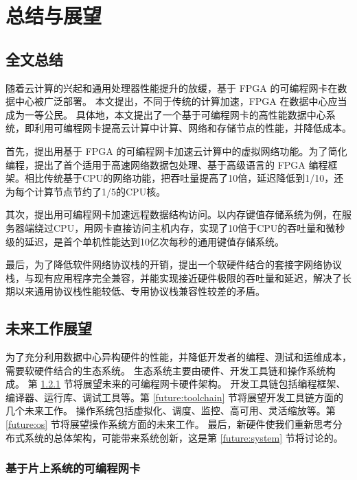 \chapter{总结与展望}

\section{全文总结}

随着云计算的兴起和通用处理器性能提升的放缓，基于 FPGA 的可编程网卡在数据中心被广泛部署。
本文提出，不同于传统的计算加速，FPGA 在数据中心应当成为一等公民。
具体地，本文提出了一个基于可编程网卡的高性能数据中心系统，即利用可编程网卡提高云计算中计算、网络和存储节点的性能，并降低成本。

首先，提出用基于 FPGA 的可编程网卡加速云计算中的虚拟网络功能。为了简化编程，提出了首个适用于高速网络数据包处理、基于高级语言的 FPGA 编程框架。相比传统基于CPU的网络功能，把吞吐量提高了10倍，延迟降低到1/10，还为每个计算节点节约了1/5的CPU核。

其次，提出用可编程网卡加速远程数据结构访问。以内存键值存储系统为例，在服务器端绕过CPU，用网卡直接访问主机内存，实现了10倍于CPU的吞吐量和微秒级的延迟，是首个单机性能达到10亿次每秒的通用键值存储系统。

最后，为了降低软件网络协议栈的开销，提出一个软硬件结合的套接字网络协议栈，与现有应用程序完全兼容，并能实现接近硬件极限的吞吐量和延迟，解决了长期以来通用协议栈性能较低、专用协议栈兼容性较差的矛盾。

\section{未来工作展望}

为了充分利用数据中心异构硬件的性能，并降低开发者的编程、测试和运维成本，需要软硬件结合的生态系统。
生态系统主要由硬件、开发工具链和操作系统构成。
第 \ref{future:progammable_nic} 节将展望未来的可编程网卡硬件架构。
开发工具链包括编程框架、编译器、运行库、调试工具等。第 \ref{future:toolchain} 节将展望开发工具链方面的几个未来工作。
操作系统包括虚拟化、调度、监控、高可用、灵活缩放等。第 \ref{future:os} 节将展望操作系统方面的未来工作。
最后，新硬件使我们重新思考分布式系统的总体架构，可能带来系统创新，这是第 \ref{future:system} 节将讨论的。

\subsection{基于片上系统的可编程网卡}
\label{future:progammable_nic}



